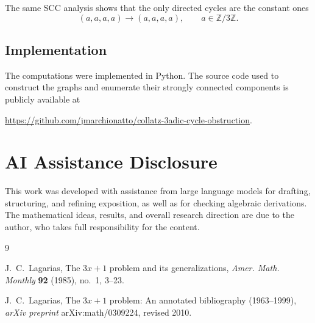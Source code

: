 \documentclass[11pt]{article}
\theoremstyle{definition}
\theoremstyle{plain}
\theoremstyle{remark}
\begin{document}
The same SCC analysis shows that the only directed cycles
are the constant ones
\[
(a,a,a,a)\to(a,a,a,a),
\qquad a\in\mathbb{Z}/3\mathbb{Z}.
\]

\subsection{Implementation}

The computations were implemented in Python. The source code used to
construct the graphs and enumerate their strongly connected components is
publicly available at

\url{https://github.com/jmarchionatto/collatz-3adic-cycle-obstruction}.

\section*{AI Assistance Disclosure}

This work was developed with assistance from large language models for drafting,
structuring, and refining exposition, as well as for checking algebraic derivations.
The mathematical ideas, results, and overall research direction are due to the
author, who takes full responsibility for the content.

\begin{thebibliography}{9}

J.~C.~Lagarias,
\newblock The $3x+1$ problem and its generalizations,
\newblock \emph{Amer. Math. Monthly} \textbf{92} (1985), no.~1, 3--23.

J.~C.~Lagarias,
\newblock The $3x+1$ problem: An annotated bibliography (1963--1999),
\newblock \emph{arXiv preprint} arXiv:math/0309224, revised 2010.

\end{thebibliography}
\end{document}
